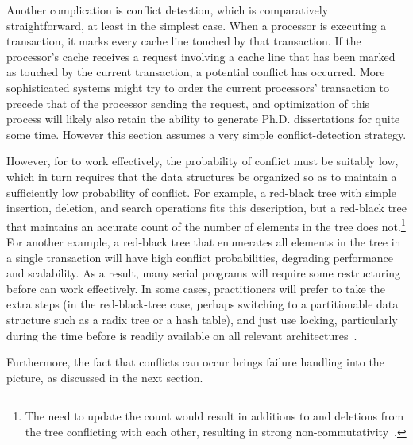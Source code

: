 Another complication is conflict detection, which is comparatively
straightforward, at least in the simplest case.
When a processor is executing a transaction, it marks every cache line
touched by that transaction.
If the processor's cache receives a request involving a cache line that
has been marked as touched by the current transaction, a potential
conflict has occurred.
More sophisticated systems might try to order the current processors'
transaction to precede that of the processor sending the request,
and optimization of this process will likely also retain the ability
to generate Ph.D. dissertations for quite some time.
However this section assumes a very simple conflict-detection strategy.

However, for  to work effectively, the probability of conflict must
be suitably low, which in turn requires that the data structures
be organized so as to maintain a sufficiently low probability of conflict.
For example, a red-black tree with simple insertion, deletion, and search
operations fits this description, but a red-black
tree that maintains an accurate count of the number of elements in
the tree does not.\footnote{
	The need to update the count would result in additions to and
	deletions from the tree conflicting with each other, resulting
	in strong non-commutativity~\cite{HagitAttiya2011LawsOfOrder,Attiya:2011:LOE:1925844.1926442,PaulEMcKenney2011SNC}.}
For another example, a red-black tree that enumerates all elements in
the tree in a single transaction will have high conflict probabilities,
degrading performance and scalability.
As a result, many serial programs will require some restructuring before
 can work effectively.
In some cases, practitioners will prefer to take the extra steps
(in the red-black-tree case, perhaps switching to a partitionable
data structure such as a radix tree or a hash table), and just
use locking, particularly during the time before  is readily available
on all relevant
architectures~\cite{CliffClick2009AzulHTM}.

\QuickQuizEnd

Furthermore, the fact that conflicts can occur brings failure handling
into the picture, as discussed in the next section.

